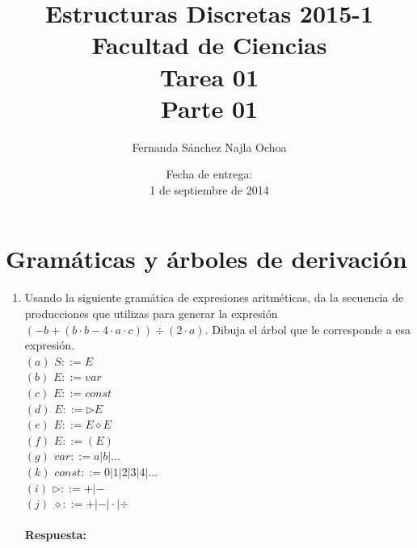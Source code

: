 \documentclass{article}
\begin{document}
\title{Estructuras Discretas 2015-1\\
Facultad de Ciencias\\
Tarea 01 \\ \large {Parte 01}}
\author{Fernanda Sánchez \quad Najla Ochoa}
\date{Fecha de entrega: \\ 1 de septiembre de 2014}
\maketitle

\section*{Gramáticas y árboles de derivación}
\begin{enumerate}

	\item{Usando la siguiente gramática de expresiones aritméticas, da la secuencia de producciones que utilizas para generar la expresión $(-b + (b  \cdot b - 4  \cdot a  \cdot c)) \div (2  \cdot a)$. Dibuja el árbol que le corresponde a esa expresión.}\\
		$(a)$ $S ::= E $\\
		$(b)$ $E ::= var $\\
        	$(c)$ $E ::= const $\\			
		$(d)$ $E ::= \rhd E $\\
		$(e)$ $E ::= E \diamond E$\\
		$(f)$ $E ::= (E)$\\
		$(g)$ $var ::= a|b|...$\\
		$(k)$ $const ::= 0|1|2|3|4|...$\\
		$(i)$ $\rhd ::= +|- $\\
		$(j)$ $\diamond ::= +|-|\cdot|\div$\\ \\
		
		\large{\textbf{Respuesta:}} \normalsize \\


\end{enumerate}
\end{document}
